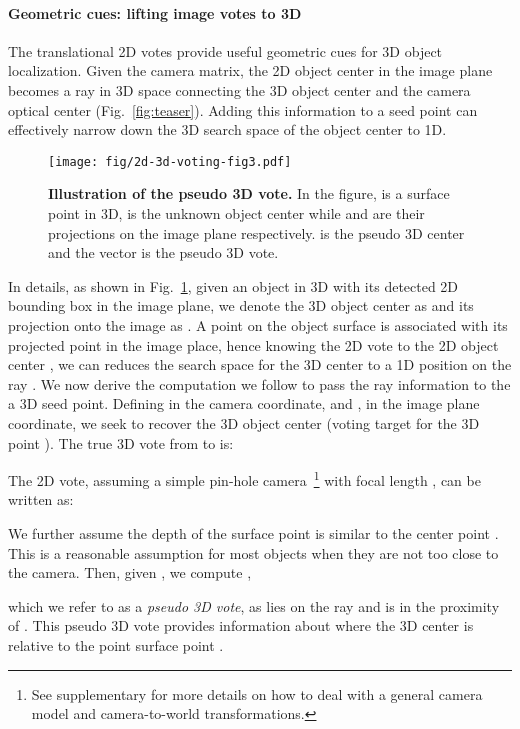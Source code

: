 \documentclass[10pt,twocolumn,letterpaper]{article}
\begin{document}
\paragraph{Geometric cues: lifting image votes to 3D}
The translational 2D votes provide useful geometric cues for 3D object localization. Given the camera matrix, the 2D object center in the image plane becomes a ray in 3D space connecting the 3D object center and the camera optical center (Fig.~\ref{fig:teaser}). Adding this information to a seed point can effectively narrow down the 3D search space of the object center to 1D.

\begin{figure}[t]
    \centering
    \texttt{[image: fig/2d-3d-voting-fig3.pdf]}
    \caption{\textbf{Illustration of the pseudo 3D vote.} In the figure,  is a surface point in 3D,  is the unknown object center while  and  are their projections on the image plane respectively.  is the pseudo 3D center and the vector  is the pseudo 3D vote.}
    \label{fig:2d_to_3d}
\end{figure}


In details, as shown in Fig.~\ref{fig:2d_to_3d}, given an object in 3D with its detected 2D bounding box in the image plane, we denote the 3D object center as  and its projection onto the image as . A point  on the object surface is associated with its projected point  in the image place, hence knowing the 2D vote to the 2D object center , we can reduces the search space for the 3D center to a 1D position on the ray . We now derive the computation we follow to pass the ray information to the a 3D seed point. Defining  in the camera coordinate, and ,  in the image plane coordinate, we seek to recover the 3D object center  (voting target for the 3D point ).
The true 3D vote from  to  is:



The 2D vote, assuming a simple pin-hole camera~\footnote{See supplementary for more details on how to deal with a general camera model and camera-to-world transformations.} with focal length , can be written as:


We further assume the depth of the surface point  is similar to the center point . This is a reasonable assumption for most objects when they are not too close to the camera. 
Then, given , we compute , 


which we refer to as a \emph{pseudo 3D vote}, as  lies on the ray  and is in the proximity of .
This pseudo 3D vote provides information about where the 3D center is relative to the point surface point . 
\end{document}

